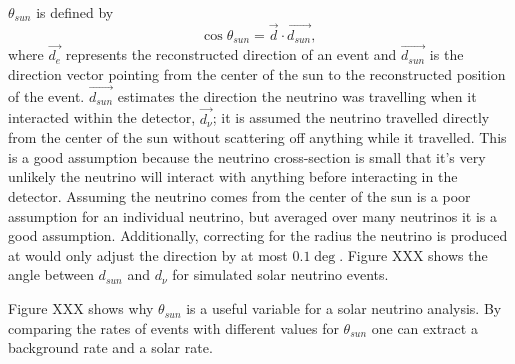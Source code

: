 $\theta_{sun}$ is defined by
\begin{equation}
\cos\theta_{sun} = \vec{d}\cdot\vec{d_{sun}}\text{, }
\end{equation}
where $\vec{d_{e}}$ represents the reconstructed direction of an event and
$\vec{d_{sun}}$ is the direction vector pointing from the center of the sun to
the reconstructed position of the event.
$\vec{d_{sun}}$ estimates the direction the neutrino was travelling when it interacted
within the detector, $\vec{d_{\nu}}$; it is assumed the neutrino travelled directly
from the center of the sun without scattering off anything while it travelled.
This is a good assumption because the neutrino cross-section is small that it's very
unlikely the neutrino will interact with anything before interacting in the detector.
Assuming the neutrino comes from the center of the sun is a poor assumption for an individual
neutrino, but averaged over many neutrinos it is a good assumption.
Additionally, correcting for the radius the neutrino is produced at would only adjust
the direction by at most $0.1\deg$.
Figure XXX shows the angle between $d_{sun}$ and $d_{\nu}$ for simulated solar neutrino
events.

Figure XXX shows why $\theta_{sun}$ is a useful variable for a solar neutrino analysis.
By comparing the rates of events with different values for $\theta_{sun}$ one can
extract a background rate and a solar rate.







